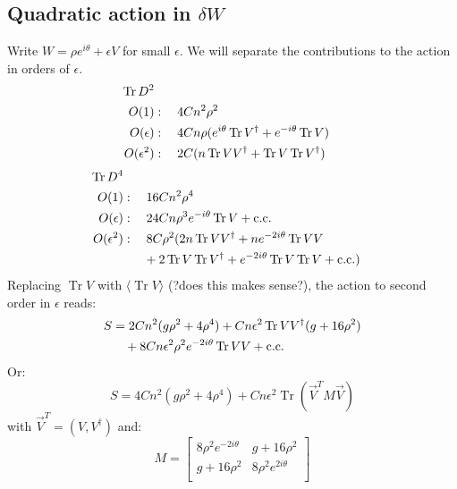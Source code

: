 \documentclass[12pt,a4paper]{article}
\DeclareMathOperator{\Tr}{Tr}
\newcommand{\eit}{e^{i \theta}}
\newcommand{\eits}{e^{2i \theta}}
\newcommand{\emit}{e^{-i \theta}}
\newcommand{\emits}{e^{-2i \theta}}
\begin{document}
\subsection{Quadratic action in $\delta W$}
Write $W = \rho \eit + \epsilon V$ for small $\epsilon$. We will separate the contributions to the action in orders of $\epsilon$.
\begin{align}
\Tr D^2 \notag \\
O(1)&: \quad 4Cn^2 \rho^2 \\
O(\epsilon)&: \quad 4Cn \rho (\eit \Tr V^\dagger + \emit \Tr V) \\
O(\epsilon^2)&: \quad 2C (n \Tr V V^\dagger + \Tr V \Tr V^\dagger)
\end{align}
\begin{align}
\Tr D^4 \notag \\
O(1)&: \quad 16Cn^2 \rho^4 \\
O(\epsilon)&: \quad 24 C n \rho^3 \emit \Tr V + \text{c.c.} \\
O(\epsilon^2)&: \quad 8C\rho^2(2n \Tr V V^\dagger + n \emits \Tr V V \\
&\phantom{:\quad \ }+2 \Tr V \Tr V^\dagger + \emits \Tr V \Tr V + \text{c.c.}) \notag 
\end{align}
Replacing $\Tr V$ with $\langle \Tr V \rangle$ (?does this makes sense?), the action to second order in $\epsilon$ reads:
\begin{align}
S &= 2Cn^2(g \rho^2 + 4\rho^4) + Cn \epsilon^2 \Tr V V^\dagger (g + 16 \rho^2) \notag \\
&\phantom{\quad}+ 8Cn \epsilon^2 \rho^2 \emits \Tr V V + \text{c.c.}
\end{align}
Or:
\begin{equation}
S = 4Cn^2(g \rho^2 + 4 \rho^4) + Cn \epsilon^2 \Tr(\vec{V}^T M \vec{V}) 
\end{equation}
with $\vec{V}^T = (V, V^\dagger)$ and:
\begin{equation}
M = \begin{bmatrix}
    8 \rho^2 \emits & g + 16 \rho^2 \\
    g + 16 \rho^2 & 8 \rho^2 \eits \\
\end{bmatrix}
\end{equation}
\end{document}
